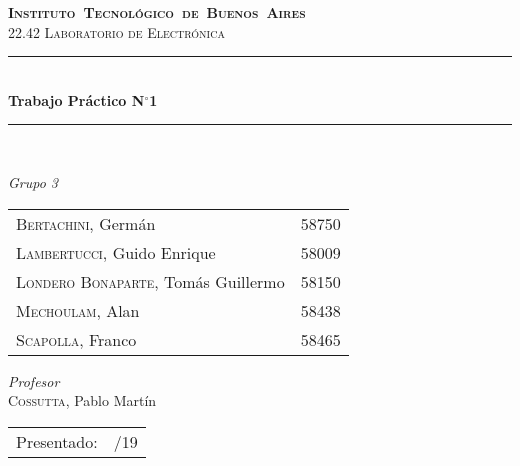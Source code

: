 \begin{titlepage}

\newcommand{\HRule}{\rule{\linewidth}{0.5mm}}
\center
\mbox{\textsc{\LARGE \bfseries {Instituto Tecnológico de Buenos Aires}}}\\[1.5cm]
\textsc{\Large 22.42 Laboratorio de Electrónica}\\[0.5cm]


\HRule \\[0.6cm]
{ \Huge \bfseries Trabajo Práctico N$^{\circ}$1}\\[0.4cm] 
\HRule \\[1.5cm]


{\large

\emph{Grupo 3}\\
\vspace{3px}

\begin{tabular}{lr} 	
\textsc{Bertachini}, Germán  & 58750 \\ 	
\textsc{Lambertucci}, Guido Enrique  & 58009 \\
\textsc{Londero Bonaparte}, Tomás Guillermo  & 58150 \\
\textsc{Mechoulam}, Alan  &  58438\\
\textsc{Scapolla}, Franco & 58465
\end{tabular}

\vspace{20px}

\emph{Profesor}\\
\vspace{3px}
\textsc{Cossutta}, Pablo Martín\\	

\vspace{100px}

\begin{tabular}{ll}

Presentado: & /19\\

\end{tabular}

}

\vfill

\end{titlepage}

